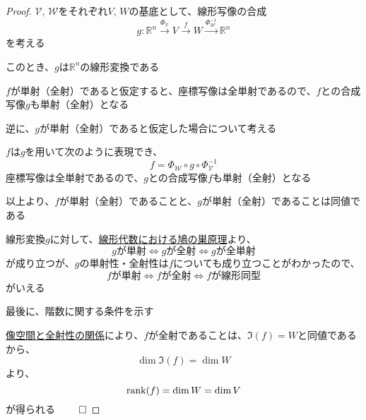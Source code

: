\documentclass[../../../topic_linear-algebra]{subfiles}
\begin{document}
\begin{proof}
  $\mathcal{V},\,\mathcal{W}$をそれぞれ$V,\,W$の基底として、線形写像の合成
  \begin{equation*}
    g\colon \mathbb{R}^n \xrightarrow{\Phi_\mathcal{V}} V \xrightarrow{f} W \xrightarrow{\Phi_\mathcal{W}^{-1}} \mathbb{R}^n
  \end{equation*}
  を考える

  このとき、$g$は$\mathbb{R}^n$の線形変換である

  \br

  $f$が単射（全射）であると仮定すると、座標写像は全単射であるので、$f$との合成写像$g$も単射（全射）となる

  \br

  逆に、$g$が単射（全射）であると仮定した場合について考える

  $f$は$g$を用いて次のように表現でき、
  \begin{equation*}
    f = \Phi_\mathcal{W} \circ g \circ \Phi_\mathcal{V}^{-1}
  \end{equation*}
  座標写像は全単射であるので、$g$との合成写像$f$も単射（全射）となる

  \br

  以上より、$f$が単射（全射）であることと、$g$が単射（全射）であることは同値である

  \br

  線形変換$g$に対して、\hyperref[thm:linear-pigeonhole]{線形代数における鳩の巣原理}より、
  \begin{equation*}
    g\text{が単射} \Longleftrightarrow g\text{が全射} \Longleftrightarrow g\text{が全単射}
  \end{equation*}
  が成り立つが、$g$の単射性・全射性は$f$についても成り立つことがわかったので、
  \begin{equation*}
    f\text{が単射} \Longleftrightarrow f\text{が全射} \Longleftrightarrow f\text{が線形同型}
  \end{equation*}
  がいえる

  \br

  最後に、階数に関する条件を示す

  \hyperref[sec:image-and-surjectivity]{像空間と全射性の関係}により、$f$が全射であることは、$\Im(f) = W$と同値であるから、
  \begin{equation*}
    \dim \Im(f) = \dim W
  \end{equation*}
  より、
  \begin{equation*}
    \rank(f) = \dim W = \dim V
  \end{equation*}
  が得られる $\qed$
\end{proof}
\end{document}
